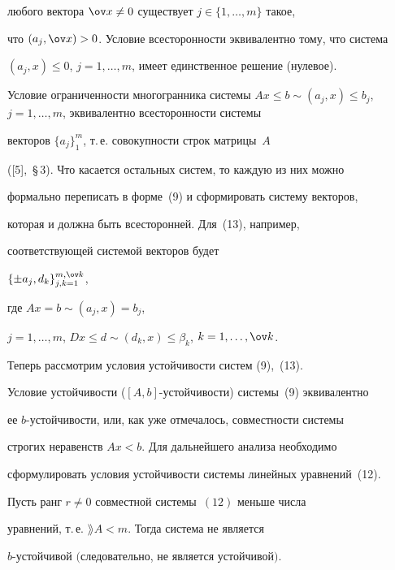 любого вектора $\ov x\neq 0$ существует $j\in \{1,\dotsc,m\}$ такое,


что $(a_j,\ov x)>0$. Условие всесторонности эквивалентно тому, что система


$(a_j,x)\leq 0$, $j=1,\dotsc,m$, имеет единственное решение (нулевое).


Условие ограниченности многогранника системы $Ax\leq b \sim


(a_j,x)\leq b_j$, $j=1,\dotsc,m$, эквивалентно всесторонности системы


векторов $\{a_j\}_1^m$, т.\,е. совокупности строк матрицы~$A$


([5],~\S\,3). Что касается остальных систем, то каждую из них можно


формально переписать в форме~(9) и сформировать систему векторов,


которая и должна быть всесторонней. Для~(13), например,


соответствующей системой векторов будет


$\{\pm a_j,d_k\}_{j,k=1}^{m,\ov k}$,


где $Ax=b \sim (a_j,x)= b_j$,


$j=1,\dotsc,m$, $Dx\leq d \sim (d_k,x)\leq \beta_k$, $k=1,\dotsc,\ov k$.





Теперь рассмотрим условия устойчивости систем (9),~(13).


Условие устойчивости ($[A,b]$-устойчивости) системы~(9) эквивалентно


ее $b$-устойчивости, или, как уже отмечалось, совместности системы


строгих неравенств $Ax<b$. Для дальнейшего анализа необходимо


сформулировать условия устойчивости системы линейных уравнений~(12).





\begin{lem}


Пусть ранг $r\neq 0$ совместной системы~$(12)$ меньше числа


уравнений, т.\,е. $\rang A<m$. Тогда система не является


$b$-устойчивой $($следовательно, не является устойчивой$)$.


\end{lem}





